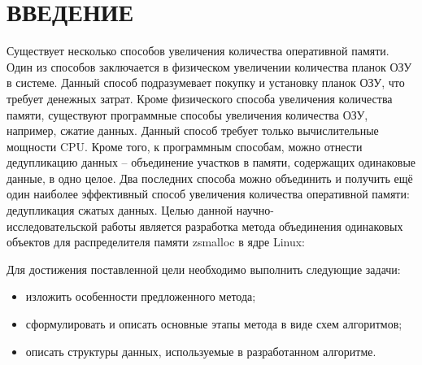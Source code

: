 \section*{ВВЕДЕНИЕ}

Существует несколько способов увеличения количества оперативной памяти. Один из способов заключается в физическом увеличении количества планок ОЗУ в системе. Данный способ подразумевает покупку и установку планок ОЗУ, что требует денежных затрат. Кроме физического способа увеличения количества памяти, существуют программные способы увеличения количества ОЗУ, например, сжатие данных. Данный способ требует только вычислительные мощности CPU. Кроме того, к программным способам, можно отнести дедупликацию данных -- объединение участков в памяти, содержащих одинаковые данные, в одно целое. Два последних способа можно объединить и получить ещё один наиболее эффективный способ увеличения количества оперативной памяти: дедупликация сжатых данных. Целью данной научно-\\исследовательской работы является разработка метода объединения одинаковых объектов для распределителя памяти zsmalloc в ядре Linux:

Для достижения поставленной цели необходимо выполнить следующие задачи:

\begin{itemize}
	\item изложить особенности предложенного метода;
	\item сформулировать и описать основные этапы метода в виде схем алгоритмов;
	\item описать структуры данных, используемые в разработанном алгоритме.
\end{itemize}

\pagebreak
